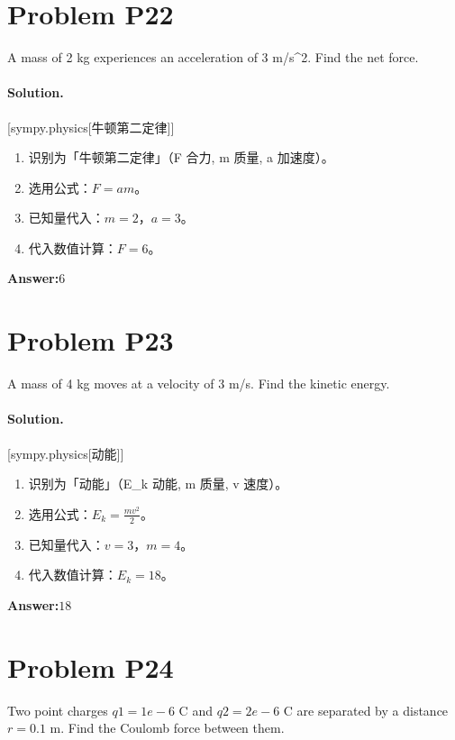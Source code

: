 \documentclass[11pt,a4paper]{ctexart}
\newcommand{\solvertag}[1]{{\footnotesize\color{gray}\textsf{[#1]}}}
\begin{document}
\section*{Problem P22}
A mass of 2 kg experiences an acceleration of 3 m/s\textasciicircum{}2. Find the net force.

\paragraph{Solution.} \solvertag{sympy.physics[牛顿第二定律]} 

\begin{enumerate}[leftmargin=*]
  \item 识别为「牛顿第二定律」（F 合力, m 质量, a 加速度）。
  \item 选用公式：$F = a m$。
  \item 已知量代入：$m = 2$，$a = 3$。
  \item 代入数值计算：$ F = 6 $。
\end{enumerate}

\noindent\textbf{Answer:}\quad $6$

\medskip

\section*{Problem P23}
A mass of 4 kg moves at a velocity of 3 m/s. Find the kinetic energy.

\paragraph{Solution.} \solvertag{sympy.physics[动能]} 

\begin{enumerate}[leftmargin=*]
  \item 识别为「动能」（E\_k 动能, m 质量, v 速度）。
  \item 选用公式：$E_{k} = \frac{m v^{2}}{2}$。
  \item 已知量代入：$v = 3$，$m = 4$。
  \item 代入数值计算：$ E_{k} = 18 $。
\end{enumerate}

\noindent\textbf{Answer:}\quad $18$

\medskip

\section*{Problem P24}
Two point charges $q1 = 1e-6$ C and $q2 = 2e-6$ C are separated by a distance $r = 0.1$ m. Find the Coulomb force between them.
\end{document}
